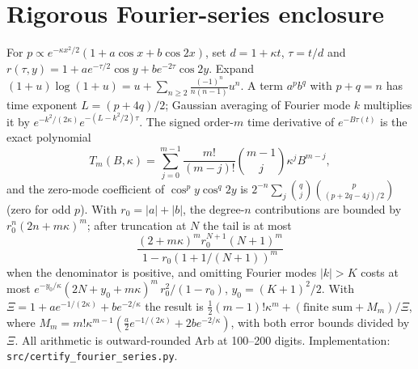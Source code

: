 \documentclass[11pt]{article}
\theoremstyle{definition}
\theoremstyle{remark}
\begin{document}
\section{Rigorous Fourier-series enclosure}\label{app:series}
For $p\propto e^{-\kappa x^2/2}(1+a\cos x+b\cos2x)$, set $d=1+\kappa t$,
$\tau=t/d$ and $r(\tau,y)=1+ae^{-\tau/2}\cos y+be^{-2\tau}\cos2y$. Expand
$(1+u)\log(1+u)=u+\sum_{n\ge2}\frac{(-1)^n}{n(n-1)}u^n$. A term $a^pb^q$ with
$p+q=n$ has time exponent $L=(p+4q)/2$; Gaussian averaging of Fourier mode $k$
multiplies it by $e^{-k^2/(2\kappa)}e^{-(L-k^2/2)\tau}$. The signed order-$m$ time
derivative of $e^{-B\tau(t)}$ is the exact polynomial
\[
 T_m(B,\kappa)=\sum_{j=0}^{m-1}\frac{m!}{(m-j)!}\binom{m-1}{j}\kappa^jB^{m-j},
\]
and the zero-mode coefficient of $\cos^py\cos^q2y$ is
$2^{-n}\sum_{j}\binom qj\binom p{(p+2q-4j)/2}$ (zero for odd $p$). With
$r_0=|a|+|b|$, the degree-$n$ contributions are bounded by $r_0^n(2n+m\kappa)^m$;
after truncation at $N$ the tail is at most
\[
 \frac{(2+m\kappa)^mr_0^{N+1}(N+1)^m}{1-r_0(1+1/(N+1))^m}
\]
when the denominator is positive, and omitting Fourier modes $|k|>K$ costs at most
$e^{-y_0/\kappa}(2N+y_0+m\kappa)^m\,r_0^2/(1-r_0)$, $y_0=(K+1)^2/2$. With
$\Xi=1+ae^{-1/(2\kappa)}+be^{-2/\kappa}$ the result is
$\tfrac12(m-1)!\kappa^m+(\text{finite sum}+M_m)/\Xi$, where
$M_m=m!\kappa^{m-1}(\tfrac a2e^{-1/(2\kappa)}+2be^{-2/\kappa})$, with both error
bounds divided by $\Xi$. All arithmetic is outward-rounded Arb at 100--200 digits.
Implementation: \texttt{src/certify\_fourier\_series.py}.
\end{document}

